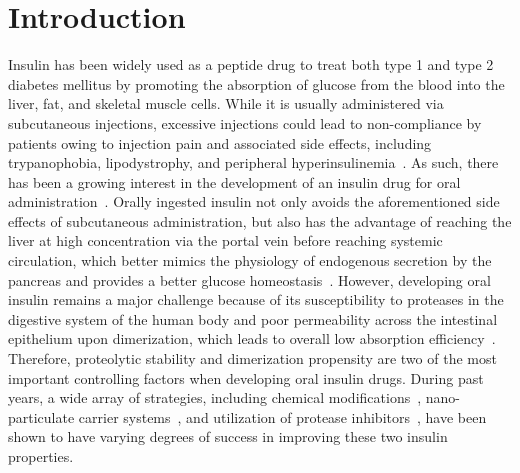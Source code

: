 \documentclass[9pt]{elife}
\begin{document}
\section{Introduction}
Insulin has been widely used as a peptide drug to treat both type 1 and type 2 diabetes mellitus by promoting the absorption of glucose from the blood into the liver, fat, and skeletal muscle cells. While it is usually administered via subcutaneous injections, excessive injections could lead to non-compliance by patients owing to injection pain and associated side effects, including trypanophobia, lipodystrophy, and peripheral hyperinsulinemia~\cite{carino1999oral}. As such, there has been a growing interest in the development of an insulin drug for oral administration~\cite{carino1999oral, fonte2013oral, gedawy2018oral}. Orally ingested insulin not only avoids the aforementioned side effects of subcutaneous administration, but also has the advantage of reaching the liver at high concentration via the portal vein before reaching systemic circulation, which better mimics the physiology of endogenous secretion by the pancreas and provides a better glucose homeostasis~\cite{hoffman1997pharmacokinetic, owens2002new}. 
However, developing oral insulin remains a major challenge because of its susceptibility to proteases in the digestive system of the human body and poor permeability across the intestinal epithelium upon dimerization, which leads to overall low absorption efficiency~\cite{bruno2013basics}. Therefore, proteolytic stability and dimerization propensity are two of the most important controlling factors when developing oral insulin drugs. During past years, a wide array of strategies, including chemical modifications~\cite{hinds2002effects, clement2002oral}, nano-particulate carrier systems~\cite{deng2017selenium, bhattacharyya2017preparation, zhou2020nanocomposite}, and utilization of protease inhibitors~\cite{agarwal2000oral}, have been shown to have varying degrees of success in improving these two insulin properties. 
\end{document}
